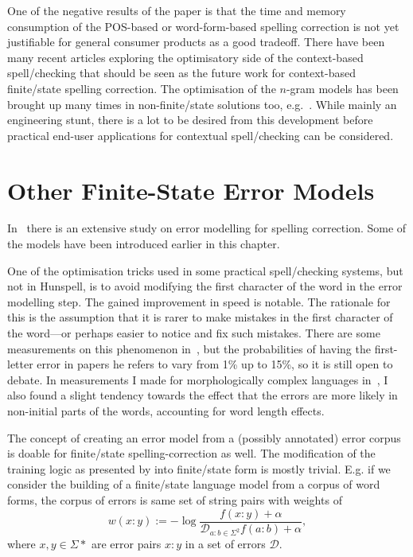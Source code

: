 \documentclass[officiallayout]{unihelcompling}
\begin{document}
One of the negative results of the paper is that the time and memory
consumption of the POS-based or word-form-based spelling correction is not yet
justifiable for general consumer products as a good tradeoff. There have been
many recent articles exploring the optimisatory side of the context-based
spell\-/checking that should be seen as the future work for context-based
finite\-/state spelling correction. The optimisation of the \(n\)-gram models has
been brought up many times in non-finite\-/state solutions too,
e.g.~\citet{church2007compressing}. While mainly an engineering stunt, there is
a lot to be desired from this development before practical end-user
applications for contextual spell\-/checking can be considered.

\section{Other Finite-State Error Models}
\label{sec:other-errors}

In~\citet{deorowicz2005correcting} there is an extensive study on error
modelling for spelling correction. Some of the models have been
introduced earlier in this chapter.

One of the optimisation tricks used in some practical spell\-/checking systems,
but not in Hunspell, is to avoid modifying the first character of the word in
the error modelling step. The gained improvement in speed is notable. The
rationale for this is the assumption that it is rarer to make mistakes in the
first character of the word---or perhaps easier to notice and fix such
mistakes. There are some measurements on this phenomenon
in~\citet{bhagat2007spelling}, but the probabilities of having the first-letter
error in papers he refers to vary from 1\% up to 15\%, so it is still open to
debate. In measurements I made for morphologically complex languages
in~, I also found a slight tendency towards
the effect that the errors are more likely in non-initial parts of the words,
accounting for word length effects.

The concept of creating an error model from a (possibly annotated) error corpus
is doable for finite\-/state spelling-correction as well. The modification of
the training logic as presented by \citep{church1991probability} into
finite\-/state form is mostly trivial. E.g. if we consider the building of a
finite\-/state language model from a corpus of word forms, the corpus of errors
is same set of string pairs with weights of 
\begin{equation}
    w(x:y) := -\log\frac{f(x:y) + \alpha}{\mathcal{D}_{a:b \in \Sigma^2} f(a:b) + \alpha},
\end{equation}
where $x, y \in \Sigma*$ are error pairs $x:y$ in a set of errors
$\mathcal{D}$.
\end{document}
